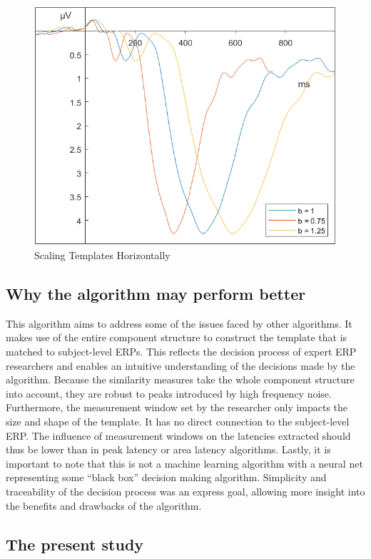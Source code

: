 \documentclass[
  man]{apa7}
\begin{document}
\begin{figure}
\includegraphics[width=0.75\linewidth]{images/b_scale} \caption{Scaling Templates Horizontally}\label{fig:b-scale-example}
\end{figure}

\hypertarget{why-the-algorithm-may-perform-better}{%
\subsection{Why the algorithm may perform better}\label{why-the-algorithm-may-perform-better}}

This algorithm aims to address some of the issues faced by other algorithms. It makes use of the entire component structure to construct the template that is matched to subject-level ERPs. This reflects the decision process of expert ERP researchers and enables an intuitive understanding of the decisions made by the algorithm. Because the similarity measures take the whole component structure into account, they are robust to peaks introduced by high frequency noise. Furthermore, the measurement window set by the researcher only impacts the size and shape of the template. It has no direct connection to the subject-level ERP. The influence of measurement windows on the latencies extracted should thus be lower than in peak latency or area latency algorithms. Lastly, it is important to note that this is not a machine learning algorithm with a neural net representing some ``black box'' decision making algorithm. Simplicity and traceability of the decision process was an express goal, allowing more insight into the benefits and drawbacks of the algorithm.

\hypertarget{the-present-study}{%
\subsection{The present study}\label{the-present-study}}
\end{document}
